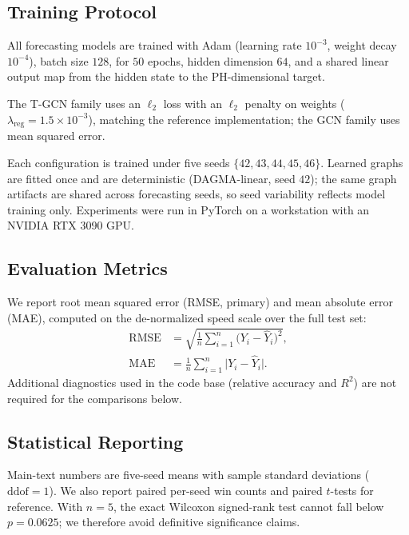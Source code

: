 \subsection{Training Protocol}\label{sec:training}

All forecasting models are trained with Adam (learning rate $10^{-3}$,
weight decay $10^{-4}$), batch size $128$, for $50$ epochs, hidden dimension
$64$, and a shared linear output map from the hidden state to the
$\mathrm{PH}$-dimensional target.

The T-GCN family uses an $\ell_2$ loss with an $\ell_2$ penalty on weights
($\lambda_{\mathrm{reg}}=1.5\times 10^{-3}$), matching the reference
implementation; the GCN family uses mean squared error.

Each configuration is trained under five seeds
$\{42,43,44,45,46\}$. Learned graphs are fitted once and are deterministic
(DAGMA-linear, seed $42$); the same graph artifacts are shared across
forecasting seeds, so seed variability reflects model training only.
Experiments were run in PyTorch on a workstation with an NVIDIA RTX 3090
GPU.

\subsection{Evaluation Metrics}\label{sec:metrics}

We report root mean squared error (RMSE, primary) and mean absolute error
(MAE), computed on the de-normalized speed scale over the full test set:
\begin{align}
\mathrm{RMSE}
&=\sqrt{\frac{1}{n}\sum_{i=1}^{n}\bigl(Y_i-\widehat{Y}_i\bigr)^{2}},
\\
\mathrm{MAE}
&=\frac{1}{n}\sum_{i=1}^{n}\bigl|Y_i-\widehat{Y}_i\bigr|.
\end{align}
Additional diagnostics used in the code base (relative accuracy and $R^2$)
are not required for the comparisons below.

\subsection{Statistical Reporting}\label{sec:stats}

Main-text numbers are five-seed means with sample standard deviations
($\mathrm{ddof}=1$). We also report paired per-seed win counts and paired
$t$-tests for reference. With $n=5$, the exact Wilcoxon signed-rank test
cannot fall below $p=0.0625$; we therefore avoid definitive significance
claims.

